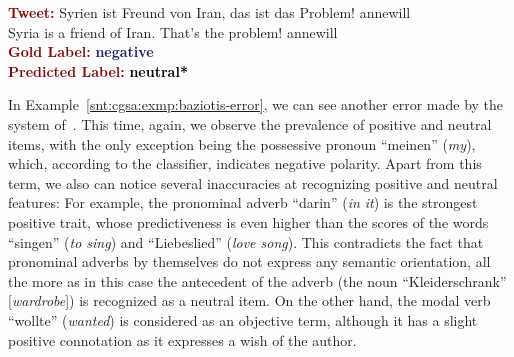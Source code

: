 \begin{example}\label{snt:cgsa:exmp:severyn-error}
  \noindent\textup{\bfseries\textcolor{darkred}{Tweet:}} {\upshape
    \colorbox{white!7.4}{Syrien} \colorbox{green!8}{ist}
    \colorbox{green!11}{Freund} \colorbox{white!6.6}{von}
    \colorbox{white!40.5}{Iran}, das \colorbox{green!8}{ist}
    \colorbox{white!12.7}{das}
    \colorbox{green!1.5}{Problem}\colorbox{green!3}{!}
    \colorbox{blue!0.000005!white!8}{annewill}}\\
  \noindent \colorbox{white!7.4}{Syria} \colorbox{green!8}{is} a \colorbox{green!11}{friend} \colorbox{white!6.6}{of} \colorbox{white!40.5}{Iran}. That\colorbox{green!8}{'s} \colorbox{white!12.7}{the} \colorbox{green!1.5}{problem}\colorbox{green!3}{!} \colorbox{blue!0.000005!white!8}{annewill}\\[\exampleSep]
  \noindent\textup{\bfseries\textcolor{darkred}{Gold Label:}}\hspace*{4.3em}\textbf{%
    \upshape\textcolor{midnightblue}{negative}}\\
 \noindent\textup{\bfseries\textcolor{darkred}{Predicted Label:}}\hspace*{2em}\textbf{%
    \upshape\textcolor{black}{neutral*}}
\end{example}

In Example~\ref{snt:cgsa:exmp:baziotis-error}, we can see another
error made by the system of~\citet{Baziotis:17}.  This time, again, we
observe the prevalence of positive and neutral items, with the only
exception being the possessive pronoun ``meinen'' (\emph{my}), which,
according to the classifier, indicates negative polarity.  Apart from
this term, we also can notice several inaccuracies at recognizing
positive and neutral features: For example, the pronominal adverb
``darin'' (\emph{in it}) is the strongest positive trait, whose
predictiveness is even higher than the scores of the words ``singen''
(\emph{to sing}) and ``Liebeslied'' (\emph{love song}).  This
contradicts the fact that pronominal adverbs by themselves do not
express any semantic orientation, all the more as in this case the
antecedent of the adverb (the noun ``Kleiderschrank''
[\emph{wardrobe}]) is recognized as a neutral item.  On the other
hand, the modal verb ``wollte'' (\emph{wanted}) is considered as an
objective term, although it has a slight positive connotation as it
expresses a wish of the author.


